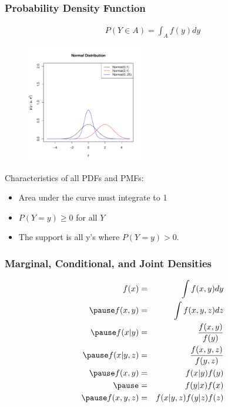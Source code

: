 \documentclass{beamer}
\begin{document}
\begin{frame}
\frametitle{Probability Density Function}
\pause
\begin{eqnarray*}
P(Y \in A) = \int_A f(y) dy
\end{eqnarray*}
\pause
\begin{figure}[!htp]
\begin{center}
\includegraphics[width=2in, height=2in]{probability-normal.pdf}
\end{center}
\end{figure}
\end{frame}

\begin{frame}
Characteristics of all PDFs and PMFs:
\bigskip
\pause
\begin{itemize}
\item Area under the curve must integrate to 1
\pause
\item $P(Y = y) \ge 0$ for all $Y$
\pause
\item The support is all y's where $P(Y = y) > 0$.
\end{itemize}
\end{frame}

\begin{frame}
\frametitle{Marginal, Conditional, and Joint Densities}
\pause
\begin{eqnarray*}
f(x) &=& \int f(x,y) dy\\
\pause
f(x,y) &=& \int f(x,y,z) dz\\
\pause
f(x|y) &=& \frac{f(x,y)}{f(y)}\\
\pause
f(x|y,z) &=& \frac{f(x,y,z)}{f(y,z)}\\
\pause
f(x,y) &=& f(x | y) f(y)\\
\pause
&=& f(y | x) f(x) \\
\pause
f(x,y,z) &=& f(x | y,z) f(y|z) f(z)
\end{eqnarray*}
\end{frame}
\end{document}
